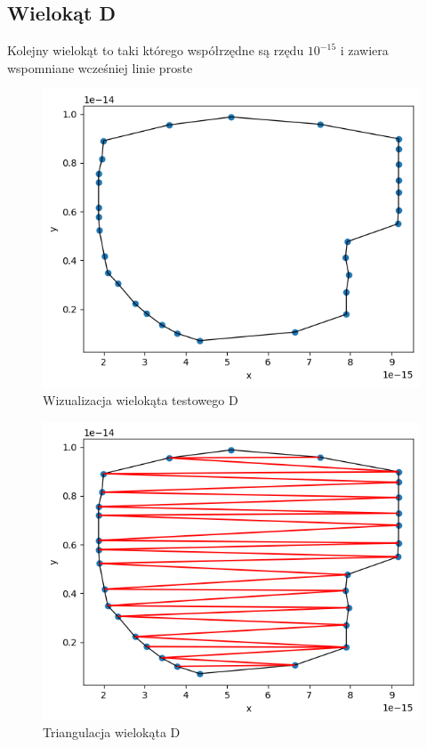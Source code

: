 \documentclass[a4paper]{article}
\begin{document}
    \subsection{Wielokąt D}
    Kolejny wielokąt to taki którego współrzędne są rzędu $10^{-15}$ i zawiera wspomniane wcześniej
    linie proste
    \begin{figure}[H]
        \centering
        \includegraphics[width=.65\textwidth]{test_d_poly.png}
        \caption{Wizualizacja wielokąta testowego D}
        \label{fig:test_d_poly}
    \end{figure}
    \begin{figure}[H]
        \centering
        \includegraphics[width=.65\textwidth]{test_d_tri.png}
        \caption{Triangulacja wielokąta D}
        \label{fig:test_d_tri}
    \end{figure}
\end{document}
